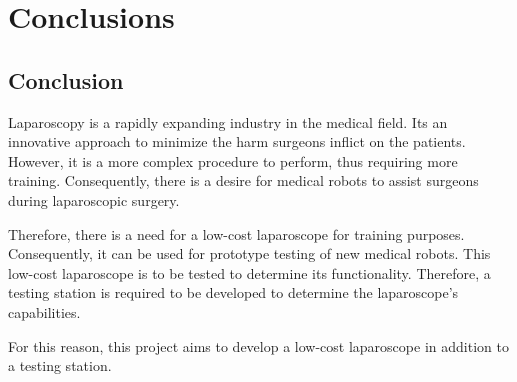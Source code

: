\chapter{Conclusions}
\label{sec:Conclusion}

\section{Conclusion}

Laparoscopy is a rapidly expanding industry in the medical field. Its an innovative approach to minimize the harm surgeons inflict on the patients. However, it is a more complex procedure to perform, thus requiring more training. Consequently, there is a desire for medical robots to assist surgeons during laparoscopic surgery.

\vspace{0.5cm}
\noindent
Therefore, there is a need for a low-cost laparoscope for training purposes. Consequently, it can be used for prototype testing of new medical robots. This low-cost laparoscope is to be tested to determine its functionality. Therefore, a testing station is required to be developed to determine the laparoscope's capabilities.

\vspace{0.5cm}
\noindent
For this reason, this project aims to develop a low-cost laparoscope in addition to a testing station.